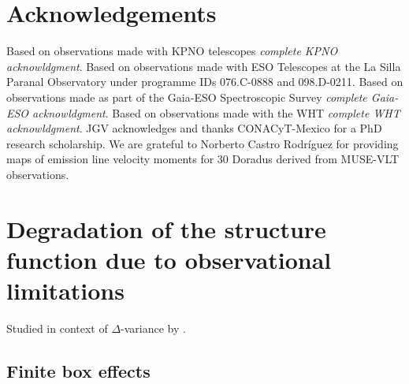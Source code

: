 \documentclass[fleqn,usenatbib, useAMS, a4paper]{mnras}
\begin{document}

\section*{Acknowledgements}

Based on observations made with KPNO telescopes
\textit{complete KPNO acknowldgment}.
Based on observations made with ESO Telescopes at the La Silla Paranal Observatory under programme IDs 076.C-0888 and 098.D-0211.
Based on observations made as part of the Gaia-ESO Spectroscopic Survey
\textit{complete Gaia-ESO acknowldgment}.
Based on observations made with the WHT
\textit{complete WHT acknowldgment}.
JGV acknowledges and thanks CONACyT-Mexico for a PhD research scholarship.
We are grateful to Norberto Castro Rodríguez for providing maps of emission line velocity moments for 30 Doradus derived from MUSE-VLT observations.







\appendix

\section{Degradation of the structure function due to observational limitations}
\label{sec:degr-struct-funct}
Studied in context of \(\Delta\)-variance by \citet{Bensch:2001l}.

\subsection{Finite box effects}
\label{sec:finite-box-effects}
\end{document}
